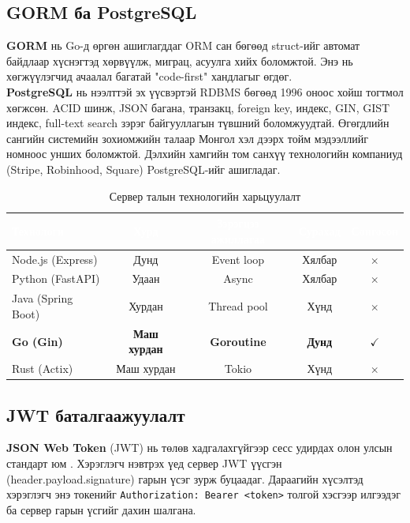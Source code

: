 \subsection{GORM ба PostgreSQL}
\textbf{GORM} \cite{gorm} нь Go-д өргөн ашиглагддаг ORM сан бөгөөд struct-ийг автомат байдлаар хүснэгтэд хөрвүүлж, миграц, асуулга хийх боломжтой. Энэ нь хөгжүүлэгчид ачаалал багатай "code-first" хандлагыг өгдөг.\\

\textbf{PostgreSQL} \cite{postgres, redbook} нь нээлттэй эх үүсвэртэй RDBMS бөгөөд 1996 оноос хойш тогтмол хөгжсөн. ACID шинж, JSON багана, транзакц, foreign key, индекс, GIN, GIST индекс, full-text search зэрэг байгууллагын түвшний боломжуудтай. Өгөгдлийн сангийн системийн зохиомжийн талаар Монгол хэл дээрх тойм мэдээллийг \cite{mn_database} номноос унших боломжтой. Дэлхийн хамгийн том санхүү технологийн компаниуд (Stripe, Robinhood, Square) PostgreSQL-ийг ашигладаг.

\begin{table}[ht]
\centering
\footnotesize
\renewcommand{\arraystretch}{1.25}
\begin{tabular}{|l|c|c|c|c|}
\hline
\rowcolor{darknavy}
\textcolor{white}{\textbf{Технологи}} & \textcolor{white}{\textbf{Хурд}} & \textcolor{white}{\textbf{Зэрэгцээ ажиллагаа}} & \textcolor{white}{\textbf{Сурахад}} & \textcolor{white}{\textbf{Сонгосон}} \\ \hline
Node.js (Express)   & Дунд      & Event loop  & Хялбар   & $\times$ \\ \hline
Python (FastAPI)    & Удаан     & Async       & Хялбар   & $\times$ \\ \hline
Java (Spring Boot)  & Хурдан    & Thread pool & Хүнд     & $\times$ \\ \hline
\textbf{Go (Gin)}   & \textbf{Маш хурдан} & \textbf{Goroutine} & \textbf{Дунд} & $\checkmark$ \\ \hline
Rust (Actix)        & Маш хурдан & Tokio      & Хүнд     & $\times$ \\ \hline
\end{tabular}
\caption{Сервер талын технологийн харьцуулалт}
\label{tab:be-cmp}
\end{table}

\subsection{JWT баталгаажуулалт}
\textbf{JSON Web Token} (JWT) нь төлөв хадгалахгүйгээр сесс удирдах олон улсын стандарт юм \cite{jwt}. Хэрэглэгч нэвтрэх үед сервер JWT үүсгэн (header.payload.signature) гарын үсэг зурж буцаадаг. Дараагийн хүсэлтэд хэрэглэгч энэ токенийг \texttt{Authorization: Bearer <token>} толгой хэсгээр илгээдэг ба сервер гарын үсгийг дахин шалгана.\\

